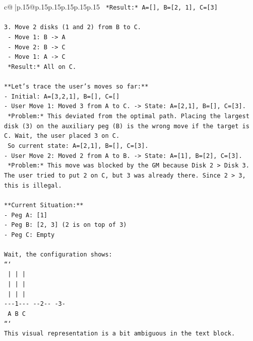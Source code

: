 \documentclass{article}
\begin{document}
{\begin{supertabular}{c@{$\;$}|p{.15\linewidth}@{}p{.15\linewidth}p{.15\linewidth}p{.15\linewidth}p{.15\linewidth}p{.15\linewidth}}
{{{\texttt{   *Result:* A={[}{]}, B={[}2, 1{]}, C={[}3{]}} \\
\\ 
\texttt{3. Move 2 disks (1 and 2) from B to C.} \\
\texttt{   {-} Move 1: B {-}> A} \\
\texttt{   {-} Move 2: B {-}> C} \\
\texttt{   {-} Move 1: A {-}> C} \\
\texttt{   *Result:* All on C.} \\
\\ 
\texttt{**Let's trace the user's moves so far:**} \\
\texttt{{-} Initial: A={[}3,2,1{]}, B={[}{]}, C={[}{]}} \\
\texttt{{-} User Move 1: Moved 3 from A to C. {-}> State: A={[}2,1{]}, B={[}{]}, C={[}3{]}.} \\
\texttt{  *Problem:* This deviated from the optimal path. Placing the largest disk (3) on the auxiliary peg (B) is the wrong move if the target is C. Wait, the user placed 3 on C.} \\
\texttt{  So current state: A={[}2,1{]}, B={[}{]}, C={[}3{]}.} \\
\texttt{{-} User Move 2: Moved 2 from A to B. {-}> State: A={[}1{]}, B={[}2{]}, C={[}3{]}.} \\
\texttt{  *Problem:* This move was blocked by the GM because Disk 2 > Disk 3. The user tried to put 2 on C, but 3 was already there. Since 2 > 3, this is illegal.} \\
\\ 
\texttt{**Current Situation:**} \\
\texttt{{-} Peg A: {[}1{]}} \\
\texttt{{-} Peg B: {[}2, 3{]} (2 is on top of 3)} \\
\texttt{{-} Peg C: Empty} \\
\\ 
\texttt{Wait, the configuration shows:} \\
\texttt{```} \\
\texttt{   |       |       |   } \\
\texttt{   |       |       |   } \\
\texttt{   |       |       |   } \\
\texttt{{-}{-}{-}1{-}{-}{-}  {-}{-}2{-}{-}    {-}3{-}  } \\
\texttt{   A       B       C   } \\
\texttt{```} \\
\texttt{This visual representation is a bit ambiguous in the text block.} \\
}}}
\end{supertabular}}
\end{document}

